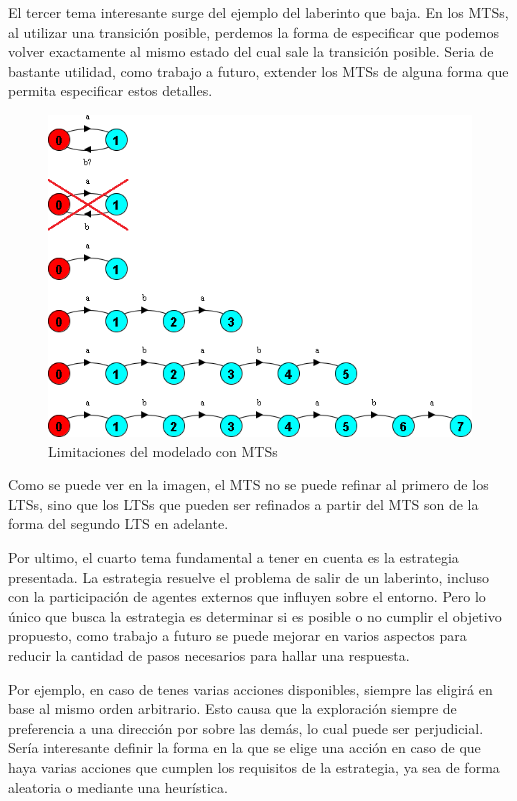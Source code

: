 \vspace{\baselineskip}
El tercer tema interesante surge del ejemplo del laberinto que baja. En los MTSs, al utilizar una transición posible, perdemos la forma
de especificar que podemos volver exactamente al mismo estado del cual sale la transición posible. Seria de bastante utilidad, como
trabajo a futuro, extender los MTSs de alguna forma que permita especificar estos detalles.

\begin{figure}[H]
	\centering
		\includegraphics[width=1.0\textwidth]{Imagenes/Otros/Limitaciones.png}
	\caption{Limitaciones del modelado con MTSs}
	\label{fig:Limitaciones}
\end{figure}

Como se puede ver en la imagen, el MTS no se puede refinar al primero de los LTSs, sino que los LTSs que pueden ser refinados a partir
del MTS son de la forma del segundo LTS en adelante.

\vspace{\baselineskip}
Por ultimo, el cuarto tema fundamental a tener en cuenta es la estrategia presentada. La estrategia resuelve el problema de salir de
un laberinto, incluso con la participación de agentes externos que influyen sobre el entorno. Pero lo único que busca la estrategia
es determinar si es posible o no cumplir el objetivo propuesto, como trabajo a futuro se puede mejorar en varios aspectos para reducir
la cantidad de pasos necesarios para hallar una respuesta.

\vspace{\baselineskip}
Por ejemplo, en caso de tenes varias acciones disponibles, siempre las eligirá en base al mismo orden arbitrario. Esto causa que la
exploración siempre de preferencia a una dirección por sobre las demás, lo cual puede ser perjudicial. Sería interesante definir la
forma en la que se elige una acción en caso de que haya varias acciones que cumplen los requisitos de la estrategia, ya sea de forma
aleatoria o mediante una heurística.

